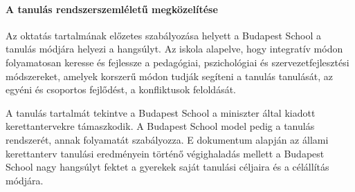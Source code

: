 \paragraph{A tanulás rendszerszemléletű megközelítése}
Az oktatás tartalmának
előzetes szabályozása helyett a Budapest School a tanulás módjára helyezi a hangsúlyt. Az iskola alapelve, hogy integratív módon folyamatosan keresse és fejlessze a pedagógiai, pszichológiai és szervezetfejlesztési módszereket, amelyek korszerű módon tudják segíteni a tanulás tanulását, az egyéni és csoportos fejlődést, a konfliktusok feloldását.

A tanulás tartalmát tekintve a Budapest School a miniszter által kiadott kerettantervekre támaszkodik. A Budapest School model pedig a tanulás rendszerét, annak folyamatát szabályozza. E dokumentum alapján az állami kerettanterv tanulási eredményein történő végighaladás mellett a Budapest School nagy hangsúlyt fektet a gyerekek saját tanulási céljaira és a célállítás módjára.
